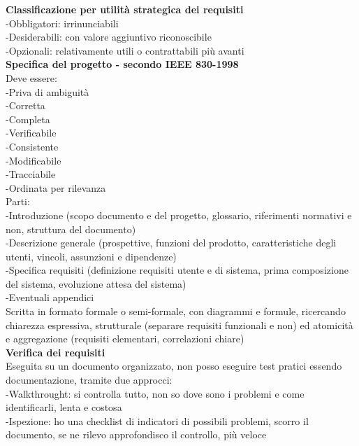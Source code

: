 \documentclass{article}
\begin{document}
		
		\textbf{Classificazione per utilità strategica dei requisiti}\\
		-Obbligatori: irrinunciabili\\
		-Desiderabili: con valore aggiuntivo riconoscibile\\
		-Opzionali: relativamente utili o contrattabili più avanti\\
		
		\textbf{Specifica del progetto - secondo IEEE 830-1998}\\
		Deve essere:\\
		-Priva di ambiguità\\
		-Corretta\\
		-Completa\\
		-Verificabile\\
		-Consistente\\
		-Modificabile\\
		-Tracciabile\\
		-Ordinata per rilevanza\\
		
		Parti:\\
		-Introduzione (scopo documento e del progetto, glossario, riferimenti normativi e non, struttura del documento)\\
		-Descrizione generale (prospettive, funzioni del prodotto, caratteristiche degli utenti, vincoli, assunzioni e dipendenze)\\
		-Specifica requisiti (definizione requisiti utente e di sistema, prima composizione del sistema, evoluzione attesa del sistema)\\
		-Eventuali appendici\\
		
		Scritta in formato formale o semi-formale, con diagrammi e formule, ricercando chiarezza espressiva, strutturale (separare requisiti funzionali e non) ed atomicità e aggregazione (requisiti elementari, correlazioni chiare)\\
		
		\textbf{Verifica dei requisiti}\\
		Eseguita su un documento organizzato, non posso eseguire test pratici essendo documentazione, tramite due approcci:\\
		-Walkthrought: si controlla tutto, non so dove sono i problemi e come identificarli, lenta e costosa\\
		-Ispezione: ho una checklist di indicatori di possibili problemi, scorro il documento, se ne rilevo approfondisco il controllo, più veloce\\
		
\end{document}
